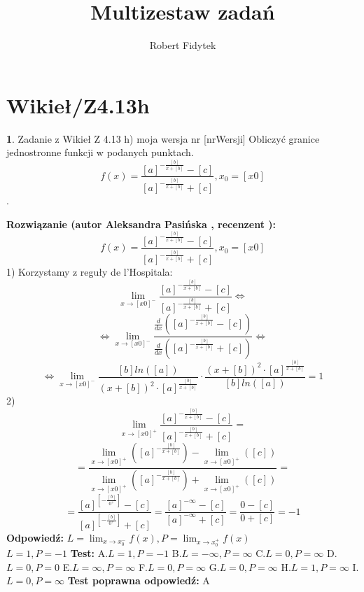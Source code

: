 \documentclass[12pt, a4paper]{article}
\title{Multizestaw zadań}
\author{Robert Fidytek}
\date{}
\theoremstyle{definition} %
\newtheorem{zad}{}
\newcommand{\kategoria}[1]{\section{#1}} %
\newcommand{\zadStart}[1]{\begin{zad}#1\newline} %
\newcommand{\zadStop}{\end{zad}}   %
\newcommand{\rozwStart}[2]{\noindent \textbf{Rozwiązanie (autor #1 , recenzent #2): }\newline} %
\newcommand{\rozwStop}{\newline}                                            %
\newcommand{\odpStart}{\noindent \textbf{Odpowiedź:}\newline}    %
\newcommand{\odpStop}{\newline}                                             %
\newcommand{\testStart}{\noindent \textbf{Test:}\newline} %
\newcommand{\testStop}{\newline} %
\newcommand{\kluczStart}{\noindent \textbf{Test poprawna odpowiedź:}\newline} %
\newcommand{\kluczStop}{\newline} %
\begin{document}
\maketitle


\kategoria{Wikieł/Z4.13h}
\zadStart{Zadanie z Wikieł Z 4.13 h) moja wersja nr [nrWersji]}
Obliczyć granice jednostronne funkcji w podanych punktach. $$f(x)=\frac{[a]^{-\frac{[b]}{x+[b]}}-[c]}{[a]^{-\frac{[b]}{x+[b]}}+[c]},x_{0}=[x0]$$.
\zadStop
\rozwStart{Aleksandra Pasińska}{}
$$f(x)=\frac{[a]^{-\frac{[b]}{x+[b]}}-[c]}{[a]^{-\frac{[b]}{x+[b]}}+[c]},x_{0}=[x0]$$
1) Korzystamy z reguły de l'Hospitala: \\
$$\lim_{x\rightarrow [x0]^-}\frac{[a]^{-\frac{[b]}{x+[b]}}-[c]}{[a]^{-\frac{[b]}{x+[b]}}+[c]}\Leftrightarrow$$ 
$$\Leftrightarrow \lim_{x\rightarrow [x0]^-}\frac{\frac{d}{dx}([a]^{-\frac{[b]}{x+[b]}}-[c])}{\frac{d}{dx}([a]^{-\frac{[b]}{x+[b]}}+[c])}\Leftrightarrow$$
$$\Leftrightarrow\lim_{x\rightarrow [x0]^-}\frac{[b]ln([a])}{(x+[b])^2\cdot [a]^{\frac{[b]}{x+[b]}}}\cdot \frac{(x+[b])^2\cdot [a]^{\frac{[b]}{x+[b]}}}{[b]ln([a])}=1$$ 
2)$$\lim_{x\rightarrow [x0]^+}\frac{[a]^{-\frac{[b]}{x+[b]}}-[c]}{[a]^{-\frac{[b]}{x+[b]}}+[c]}=$$
$$=\frac{\lim_{x\rightarrow [x0]^+}([a]^{-\frac{[b]}{x+[b]}})-\lim_{x\rightarrow [x0]^+}([c])}{\lim_{x\rightarrow [x0]^+}([a]^{-\frac{[b]}{x+[b]}})+\lim_{x\rightarrow [x0]^+}([c])}=$$
$$=\frac{[a]^{[-\frac{[b]}{0^+}]}-[c]}{[a]^{[-\frac{[b]}{0^+}]}+[c]}=\frac{[a]^{-\infty}-[c]}{[a]^{-\infty}+[c]}=\frac{0-[c]}{0+[c]}=-1$$
\rozwStop
\odpStart
$L=\lim_{x\rightarrow x_{0}^-}f(x),P=\lim_{x\rightarrow x_{0}^+}f(x)$\\
$L=1, P=-1$
\odpStop
\testStart
A.$L=1, P=-1$
B.$L=-\infty, P=\infty$
C.$L=0, P=\infty$
D.$L=0, P=0$
E.$L=\infty, P=\infty$
F.$L=0, P=\infty$
G.$L=0, P=\infty$
H.$L=1, P=\infty$
I.$L=0, P=\infty$
\testStop
\kluczStart
A
\kluczStop
\end{document}
